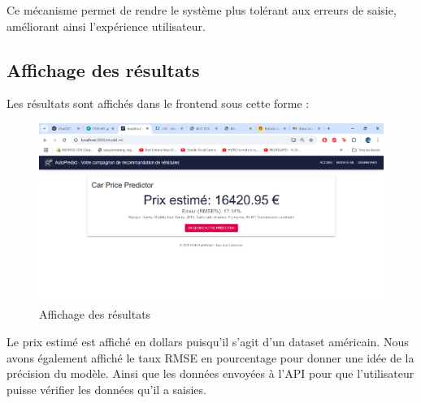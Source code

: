 \documentclass[12pt]{report}
\begin{document}
Ce mécanisme permet de rendre le système plus tolérant aux erreurs de saisie, améliorant ainsi l'expérience utilisateur.

\subsection{Affichage des résultats}

Les résultats sont affichés dans le frontend sous cette forme : 

\begin{figure}[H]
    \centering
    \includegraphics[width=1\textwidth]{resultats.png}
    \caption{Affichage des résultats}
    \label{fig:resultats}
\end{figure}
Le prix estimé est affiché en dollars puisqu'il s'agit d'un dataset américain. Nous avons également affiché le taux RMSE en pourcentage pour donner une idée de la précision du modèle. Ainsi que les données envoyées à l'API pour que l'utilisateur puisse vérifier les données qu'il a saisies.
\end{document}
